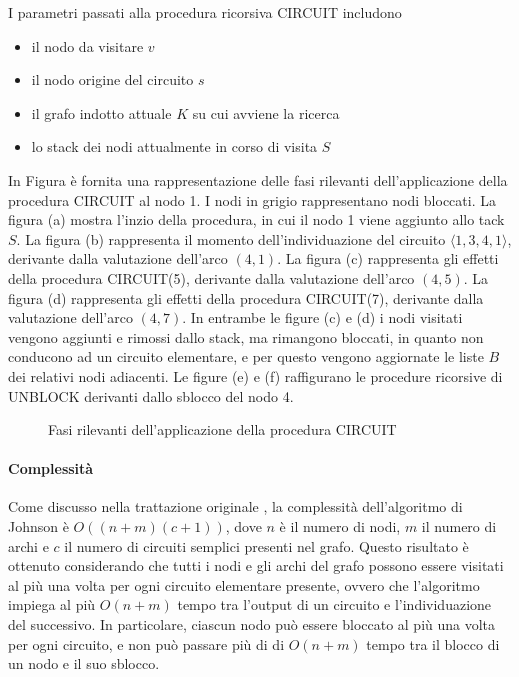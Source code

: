 

\newpage

I parametri passati alla procedura ricorsiva CIRCUIT includono
\begin{itemize}
    \item il nodo da visitare $v$
    \item il nodo origine del circuito $s$
    \item il grafo indotto attuale $K$ su cui avviene la ricerca
    \item lo stack dei nodi attualmente in corso di visita $S$
\end{itemize}




In Figura \label{fig:circuit-example} \`e fornita una rappresentazione delle fasi rilevanti dell'applicazione della
procedura CIRCUIT al nodo 1. I nodi in grigio rappresentano nodi bloccati.
La figura (a) mostra l'inzio della procedura, in cui il nodo 1 viene aggiunto allo tack $S$.
La figura (b) rappresenta il momento dell'individuazione del circuito $\langle 1, 3, 4, 1 \rangle$, derivante dalla valutazione
dell'arco $(4, 1)$.
La figura (c) rappresenta gli effetti della procedura CIRCUIT(5), derivante dalla valutazione dell'arco $(4, 5)$.
La figura (d) rappresenta gli effetti della procedura CIRCUIT(7), derivante dalla valutazione dell'arco $(4, 7)$.
In entrambe le figure (c) e (d) i nodi visitati vengono aggiunti e rimossi dallo stack, ma rimangono bloccati,
in quanto non conducono ad un circuito elementare, e per questo vengono aggiornate le liste $B$ dei relativi
nodi adiacenti.
Le figure (e) e (f) raffigurano le procedure ricorsive di UNBLOCK derivanti dallo sblocco del nodo 4.

\begin{figure}[!h] \centering
    
\caption{Fasi rilevanti dell'applicazione della procedura CIRCUIT}\label{fig:cicruit-example}
\end{figure}

\newpage

\paragraph{Complessit\`a}\label{subsec:complessit`a}
Come discusso nella trattazione originale \cite{doi:10.1137/0204007}, la complessit\`a dell'algoritmo di Johnson
\`e $O((n + m)(c + 1))$, dove $n$ \`e il numero di nodi, $m$ il numero di archi e $c$ il numero di circuiti semplici
presenti nel grafo.
Questo risultato \`e ottenuto considerando che tutti i nodi e gli archi del grafo possono essere visitati al pi\`u una
volta per ogni circuito elementare presente, ovvero che l'algoritmo impiega al pi\`u $O(n + m)$ tempo tra l'output di
un circuito e l'individuazione del successivo.
In particolare, ciascun nodo pu\`o essere bloccato al pi\`u una volta per ogni circuito, e non pu\`o passare pi\`u di
di $O(n + m)$ tempo tra il blocco di un nodo e il suo sblocco. \newline

